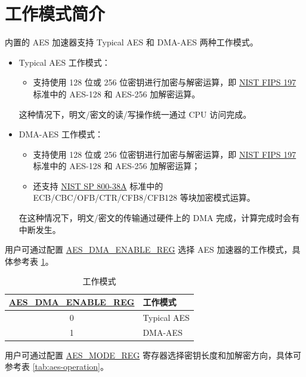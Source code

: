 \documentclass[main\_\_CN.tex]{subfiles}
\begin{document}
\section{工作模式简介}

\chipname{} 内置的 AES 加速器支持 Typical AES 和 DMA-AES 两种工作模式。

\begin{itemize}
    \item Typical AES 工作模式：
    \begin{itemize}
        \item 支持使用 128 位或 256 位密钥进行加密与解密运算，即 \href{https://nvlpubs.nist.gov/nistpubs/FIPS/NIST.FIPS.197.pdf}{NIST FIPS 197} 标准中的 AES-128 和 AES-256  加解密运算。
    \end{itemize}
    这种情况下，明文/密文的读/写操作统一通过 CPU 访问完成。
    \item DMA-AES 工作模式：
    \begin{itemize}
        \item 支持使用 128 位或 256 位密钥进行加密与解密运算，即 \href{https://nvlpubs.nist.gov/nistpubs/FIPS/NIST.FIPS.197.pdf}{NIST FIPS 197} 标准中的 AES-128 和 AES-256 加解密运算；
        \item 还支持 \href{https://nvlpubs.nist.gov/nistpubs/Legacy/SP/nistspecialpublication800-38a.pdf}{NIST SP 800-38A} 标准中的 ECB/CBC/OFB/CTR/CFB8/CFB128 等块加密模式运算。
    \end{itemize}
    在这种情况下，明文/密文的传输通过硬件上的 DMA 完成，计算完成时会有中断发生。
\end{itemize}

用户可通过配置 \hyperref[regdesc:AESDMAENABLEREG]{AES\_DMA\_ENABLE\_REG} 选择 AES 加速器的工作模式，具体参考表 \ref{tab:aes-dma-enable}。

\begin{longtable}[c]{ |c|l| }
\caption{工作模式}
\label{tab:aes-dma-enable}
\\\hline 
\rowcolor{lightgray}
\hyperref[regdesc:AESDMAENABLEREG]{AES\_DMA\_ENABLE\_REG}       & 工作模式\\
    \hline
    0           & Typical AES    \\
    \hline
    1           & DMA-AES        \\
    \hline
\end{longtable}

用户可通过配置 \hyperref[regdesc:AESMODEREG]{AES\_MODE\_REG} 寄存器选择密钥长度和加解密方向，具体可参考表 \ref{tab:aes-operation}。
\end{document}
